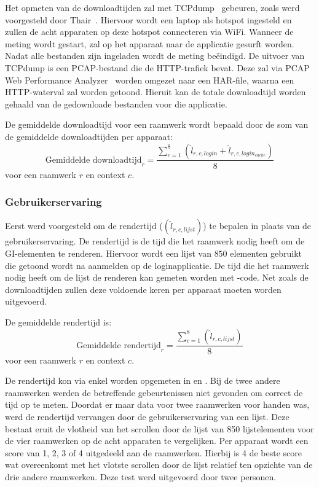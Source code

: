 Het opmeten van de downloadtijden zal met TCPdump~\cite{Tcpdump2010} gebeuren, zoals werd voorgesteld door Thair~\cite{Thair2011}.
Hiervoor wordt een laptop als hotspot ingesteld en zullen de acht apparaten op deze hotspot connecteren via WiFi.
Wanneer de meting wordt gestart, zal op het apparaat naar de applicatie gesurft worden.
Nadat alle bestanden zijn ingeladen wordt de meting beëindigd. 
De uitvoer van TCPdump is een PCAP-bestand die de HTTP-trafiek bevat.
Deze zal via PCAP Web Performance Analyzer~\cite{SongL.bmcquadeMdsteele2010} worden omgezet naar een HAR-file, waarna een HTTP-waterval zal worden getoond.
Hieruit kan de totale downloadtijd worden gehaald van de gedownloade bestanden voor die applicatie.

De gemiddelde downloadtijd voor een raamwerk wordt bepaald door de som van de gemiddelde downloadtijden per apparaat:
\begin{equation}
  \text{Gemiddelde downloadtijd}_r= \frac{\sum\limits_{c=1}^{8}{\left(\widehat{l}_{r,c,login}+\widehat{l}_{r,c,login_{cache}}\right)}}{8}
    \label{eq:totale-downloadtijd}
\end{equation}
voor een raamwerk $r$ en context $c$.

\subsubsection{Gebruikerservaring}
Eerst werd voorgesteld om de rendertijd ($\left(\widehat{l}_{r,c,lijst}\right)$) te bepalen in plaats van de gebruikerservaring.
De rendertijd is de tijd die het raamwerk nodig heeft om de GI-elementen te renderen.
Hiervoor wordt een lijst van $850$ elementen gebruikt die getoond wordt na aanmelden op de loginapplicatie.
De tijd die het raamwerk nodig heeft om de lijst de renderen kan gemeten worden met \js-code.
Net zoals de downloadtijden zullen deze voldoende keren per apparaat moeten worden uitgevoerd.

De gemiddelde rendertijd is:
\begin{equation}
 \text{Gemiddelde rendertijd}_r= \frac{\sum\limits_{c=1}^{8}{\left(\widehat{l}_{r,c,lijst}\right)}}{8}
 \label{eq:totale-gebruikerservaring}
\end{equation}
voor een raamwerk $r$ en context $c$.

De rendertijd kon via \js{} enkel worden opgemeten in \jqm{} en \kendo{}.
Bij de twee andere raamwerken werden de betreffende gebeurtenissen niet gevonden om correct de tijd op te meten.
Doordat er maar data voor twee raamwerken voor handen was, werd de rendertijd vervangen door de gebruikerservaring van een lijst.
Deze bestaat eruit de vlotheid van het scrollen door de lijst van 850 lijstelementen voor de vier raamwerken op de acht apparaten te vergelijken.
Per apparaat wordt een score van 1, 2, 3 of 4 uitgedeeld aan de raamwerken.
Hierbij is 4 de beste score wat overeenkomt met het vlotste scrollen door de lijst relatief ten opzichte van de drie andere raamwerken.
Deze test werd uitgevoerd door twee personen.

